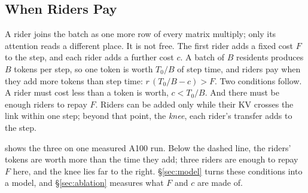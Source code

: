 \subsection{When Riders Pay}



A rider joins the batch as one more row of every matrix multiply; only its
attention reads a different place. It is not free. The first rider adds a
fixed cost $F$ to the step, and each rider adds a further cost $c$. A batch of
$B$ residents produces $B$ tokens per step, so one token is worth $T_0/B$ of
step time, and riders pay when they add more tokens than step time:
$r\,(T_0/B - c) > F$. Two conditions follow. A rider must cost less than a
token is worth, $c < T_0/B$. And there must be enough riders to repay $F$.
Riders can be added only while their KV crosses the link within one step;
beyond that point, the \emph{knee}, each rider's transfer adds to the step.

 shows the three on one measured A100 run. Below the dashed
line, the riders' tokens are worth more than the time they add; three riders
are enough to repay $F$ here, and the knee lies far to the right.
\S\ref{sec:model} turns these conditions into a model, and
\S\ref{sec:ablation} measures what $F$ and $c$ are made of.
